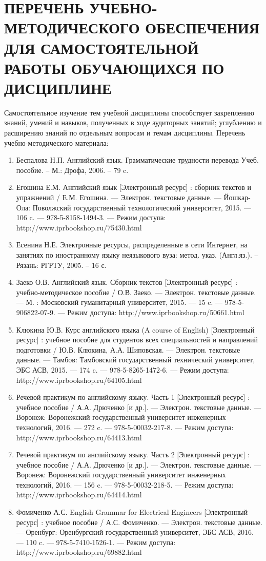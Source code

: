 \chapter{ПЕРЕЧЕНЬ УЧЕБНО-МЕТОДИЧЕСКОГО ОБЕСПЕЧЕНИЯ ДЛЯ САМОСТОЯТЕЛЬНОЙ РАБОТЫ ОБУЧАЮЩИХСЯ ПО ДИСЦИПЛИНЕ}
\label{chapt5}
Самостоятельное изучение тем учебной дисциплины способствует закреплению знаний, умений и навыков, полученных в ходе аудиторных занятий; углублению и расширению знаний по отдельным вопросам и темам дисциплины. 
Перечень учебно-методического материала:
\begin{enumerate}
\item Беспалова Н.П. Английский язык. Грамматические трудности перевода Учеб. пособие. – М.: Дрофа, 2006. – 79 c.
\item Егошина Е.М. Английский язык [Электронный ресурс] : сборник текстов и упражнений / Е.М. Егошина. — Электрон. текстовые данные. — Йошкар-Ола: Поволжский государственный технологический университет, 2015. — 106 c. — 978-5-8158-1494-3. — Режим доступа: http://www.iprbookshop.ru/75430.html
\item Есенина Н.Е. Электронные ресурсы, распределенные в сети Интернет, на занятиях по иностранному языку неязыкового вуза: метод. указ. (Англ.яз.). – Рязань: РГРТУ, 2005. – 16 с.
\item Заеко О.В. Английский язык. Сборник текстов [Электронный ресурс] : учебно-методическое пособие / О.В. Заеко. — Электрон. текстовые данные. — М. : Московский гуманитарный университет, 2015. — 15 c. — 978-5-906822-07-9. — Режим доступа: http://www.iprbookshop.ru/50661.html
\item Клюкина Ю.В. Курс английского языка (A course of English) [Электронный ресурс] : учебное пособие для студентов всех специальностей и направлений подготовки / Ю.В. Клюкина, А.А. Шиповская. — Электрон. текстовые данные. — Тамбов: Тамбовский государственный технический университет, ЭБС АСВ, 2015. — 174 c. — 978-5-8265-1472-6. — Режим доступа: http://www.iprbookshop.ru/64105.html
\item Речевой практикум по английскому языку. Часть 1 [Электронный ресурс] : учебное пособие / А.А. Дрюченко [и др.]. — Электрон. текстовые данные. — Воронеж: Воронежский государственный университет инженерных технологий, 2016. — 272 c. — 978-5-00032-217-8. — Режим доступа: http://www.iprbookshop.ru/64413.html
\item Речевой практикум по английскому языку. Часть 2 [Электронный ресурс] : учебное пособие / А.А. Дрюченко [и др.]. — Электрон. текстовые данные. — Воронеж: Воронежский государственный университет инженерных технологий, 2016. — 156 c. — 978-5-00032-218-5. — Режим доступа: http://www.iprbookshop.ru/64414.html
\item Фомиченко А.С. English Grammar for Electrical Engineers [Электронный ресурс] : учебное пособие / А.С. Фомиченко. — Электрон. текстовые данные. — Оренбург: Оренбургский государственный университет, ЭБС АСВ, 2016. — 110 c. — 978-5-7410-1526-1. — Режим доступа: http://www.iprbookshop.ru/69882.html
\end{enumerate}

